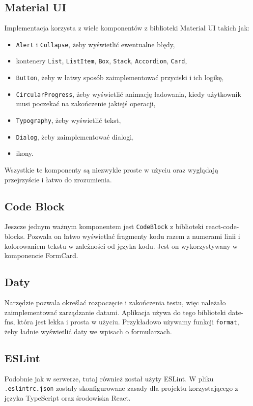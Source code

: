 \subsection{Material UI}
Implementacja korzysta z wiele komponentów z biblioteki Material UI takich jak:
\begin{itemize}
  \item \texttt{Alert} i \texttt{Collapse}, żeby wyświetlić ewentualne błędy,
  \item kontenery \texttt{List}, \texttt{ListItem}, \texttt{Box}, \texttt{Stack},
    \texttt{Accordion}, \texttt{Card},
  \item \texttt{Button}, żeby w łatwy sposób zaimplementować przyciski
    i ich logikę,
  \item \texttt{CircularProgress}, żeby wyświetlić animację ładowania, kiedy
    użytkownik musi poczekać na zakończenie jakiejś operacji,
  \item \texttt{Typography}, żeby wyświetlić tekst,
  \item \texttt{Dialog}, żeby zaimplementować dialogi,
  \item ikony.
\end{itemize}
Wszystkie te komponenty są niezwykle proste w użyciu oraz wyglądają przejrzyście
i łatwo do zrozumienia.
\subsection{Code Block}
Jeszcze jednym ważnym komponentem jest \texttt{CodeBlock} z biblioteki react-code-blocks.
Pozwala on łatwo wyświetlać fragmenty kodu razem z numerami linii i kolorowaniem
tekstu w zależności od języka kodu. Jest on wykorzystywany w komponencie FormCard.
\subsection{Daty}
Narzędzie pozwala określać rozpoczęcie i zakończenia testu, więc należało
zaimplementować zarządzanie datami. Aplikacja używa do tego biblioteki date-fns,
która jest lekka i prosta w użyciu. Przykładowo używamy funkcji \texttt{format}, żeby
ładnie wyświetlić daty we wpisach o formularzach.

\subsection{ESLint}
Podobnie jak w serwerze, tutaj również został użyty ESLint\cite{eslint}. W pliku\\
\texttt{.eslintrc.json} zostały skonfigurowane zasady dla projektu korzystającego
z języka TypeScript oraz środowiska React.

